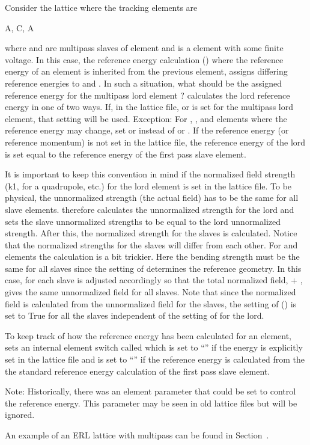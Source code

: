 Consider the lattice where the tracking elements are
\begin{example}
  A, C, A
\end{example}
where  and  are multipass slaves of element  and  is a 
element with some finite voltage. In this case, the reference energy calculation ()
where the reference energy of an element is inherited from the previous element, assigns differing
reference energies to  and . In such a situation, what should be the assigned
reference energy for the multipass lord element ? \bmad calculates the lord reference energy
in one of two ways. If, in the lattice file,  or  is set for the multipass lord
element, that setting will be used. Exception: For , , and 
elements where the reference energy may change, set  or  instead of
 or .  If the reference energy (or reference momentum) is not set in the lattice
file, the reference energy of the lord is set equal to the reference energy of the first pass slave
element.

It is important to keep this convention in mind if the normalized field strength (k1, for a
quadrupole, etc.) for the lord element is set in the lattice file. To be physical, the unnormalized
strength (the actual field) has to be the same for all slave elements. \bmad therefore calculates
the unnormalized strength for the lord and sets the slave unnormalized strengths to be equal to the
lord unnormalized strength. After this, the normalized strength for the slaves is calculated. Notice
that the normalized strengths for the slaves will differ from each other. For  and
 elements the calculation is a bit trickier. Here the  bending strength must be the
same for all slaves since the setting of  determines the reference geometry. In this case,
 for each slave is adjusted accordingly so that the total normalized field,  +
, gives the same unnormalized field for all slaves. Note that since the normalized field
is calculated from the unnormalized field for the slaves, the setting of 
() is set to True for all the slaves independent of the setting of
 for the lord.

To keep track of how the reference energy has been calculated for an element, \bmad sets an internal
element switch called  which is set to ``'' if the energy is
explicitly set in the lattice file and is set to ``'' if the reference energy is
calculated from the the standard reference energy calculation of the first pass slave element.

Note: Historically, there was an element parameter  that could be set to control the
reference energy. This parameter may be seen in old lattice files but will be ignored.

An example of an ERL lattice with multipass can be found in Section~.
